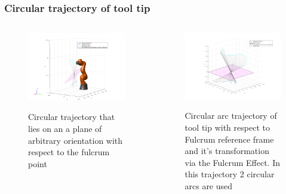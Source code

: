 \begin{frame}
\frametitle{Circular trajectory of tool tip}

\begin{columns}
\begin{center}
\begin{figure}[!htb]
\centering
\includegraphics[width=\textwidth]{../images/rcm_trajectories/robot-pose-random-rcm-circle-traj.png}\\
\caption{Circular trajectory that lies on an a plane of arbitrary orientation with respect to the fulcrum point}
\end{figure}
\end{center}

\begin{center}
\begin{figure}[!htb]
\centering
\includegraphics[width=\textwidth]{../images/rcm_trajectories/rcm_arcs_traj.png}\\
\caption{Circular arc trajectory of tool tip with respect to Fulcrum reference frame and it's transformation via the Fulcrum Effect. In this trajectory 2 circular arcs are used}
\end{figure}
\end{center}
\end{columns}
\end{frame}


